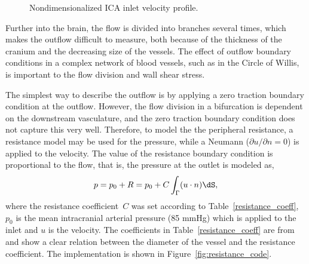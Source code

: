 \begin{figure}
  \begin{center}
  \end{center}
  \caption{Nondimensionalized ICA inlet velocity profile.}
  \label{fig:ford}
\end{figure}

Further into the brain, the flow is divided into branches several
times, which makes the outflow difficult to measure, both because of
the thickness of the cranium and the decreasing size of the vessels.
The effect of outflow boundary conditions in a complex network of
blood vessels, such as in the Circle of Willis, is important to the
flow division and wall shear stress.

The simplest way to describe the outflow is by applying a zero
traction boundary condition at the outflow. However, the flow division
in a bifurcation is dependent on the downstream vasculature, and the
zero traction boundary condition does not capture this very
well. Therefore, to model the the peripheral resistance, a resistance
model may be used for the pressure, while a Neumann (${\partial u /
  \partial n} = 0 $) is applied to the velocity. The value of the
resistance boundary condition is proportional to the flow, that is,
the pressure at the outlet is modeled as,
\begin{equation}
  p = p_0 + R = p_0 + C \int_\Gamma (u \cdot n) \dS,
\end{equation}
where the resistance coefficient~$C$ was set according to
Table~\ref{resistance_coeff}, $p_0$ is the mean intracranial arterial
pressure (85 mmHg) which is applied to the inlet and $u$ is the
velocity. The coefficients in Table~\ref{resistance_coeff} are
from~\cite{peiro} and show a clear relation between the diameter of
the vessel and the resistance coefficient. The implementation is shown
in Figure~\ref{fig:resistance_code}.

